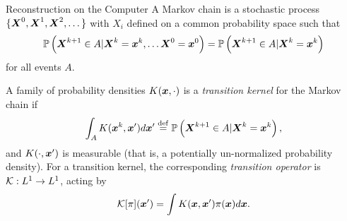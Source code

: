 \begin{chapter}{Reconstruction on the Computer}
A Markov chain is a stochastic process $\{\mbox{\boldmath$X$}^0, \mbox{\boldmath$X$}^1,\mbox{\boldmath$X$}^2,\dots\}$ with $X_i$ defined on a common probability space such that
\begin{equation} \label{eq:markovCondition}
  \mathbb P\left( \mbox{\boldmath$X$}^{k+1} \in A | \mbox{\boldmath$X$}^k= \mbox{\boldmath$x$}^k,\dots \mbox{\boldmath$X$}^0=\mbox{\boldmath$x$}^0\right) 
    = \mathbb P\left( \mbox{\boldmath$X$}^{k+1} \in A | \mbox{\boldmath$X$}^k= \mbox{\boldmath$x$}^k\right) 
\end{equation}
for all events $A$.  
  
%
A family of probability densities $K(\mbox{\boldmath$x$},\cdot)$ is a \emph{transition kernel} for the Markov chain if
\begin{equation}
  \int_A K(\mbox{\boldmath$x$}^k,\mbox{\boldmath$x$}') d\mbox{\boldmath$x$}'
    \stackrel{\rm def}{=} \mathbb P\left( \mbox{\boldmath$X$}^{k+1} \in A | \mbox{\boldmath$X$}^k= \mbox{\boldmath$x$}^k\right),
\end{equation}
and $K(\cdot , \mbox{\boldmath$x$}')$ is measurable (that is, a potentially un-normalized probability density).
For a transition kernel, the corresponding \emph{transition operator} is $\mathcal K:L^1\to L^1$, acting by
\begin{equation}
  \mathcal K [\pi](\mbox{\boldmath$x$}') = \int K(\mbox{\boldmath$x$},\mbox{\boldmath$x$}') \pi(\mbox{\boldmath$x$})d\mbox{\boldmath$x$}.
\end{equation}


\end{chapter}
